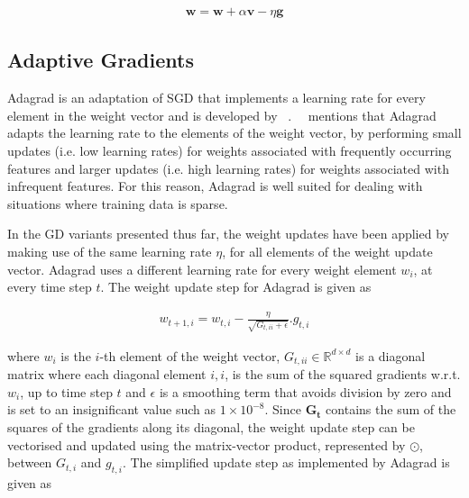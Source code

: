 \begin{equation}
	\label{eq:heuristics:gd:nag_part_2}
	\begin{split}
		\boldsymbol{w} = \boldsymbol{w} + \alpha \boldsymbol{v} - \eta \boldsymbol{g}
	\end{split}
\end{equation}


\subsection{Adaptive Gradients}\label{sec:heuristics:adagrad}

\Acf{Adagrad} is an adaptation of \acs{SGD} that implements a learning rate for every element in the weight vector and is developed by \citeauthor{ref:duchi:2011}~\cite{ref:duchi:2011}.~\citeauthor{ref:ruder:2016}~\cite{ref:ruder:2016} mentions that \acs{Adagrad} adapts the learning rate to the elements of the weight vector, by  performing small updates (i.e. low learning rates) for weights associated with frequently occurring features and larger updates (i.e. high learning rates) for weights associated with infrequent features. For this reason, \acs{Adagrad} is well suited for dealing with situations where training data is sparse.

In the \acs{GD} variants presented thus far, the weight updates have been applied by making use of the same learning rate $\eta$, for all elements of the weight update vector. \Acs{Adagrad} uses a different learning rate for every weight element $w_{i}$, at every time step $t$. The weight update step for \acs{Adagrad} is given as

\begin{equation}
	\label{eq:heuristics:gd:adagrad_part_1}
	\begin{split}
		w_{t+1,i} = w_{t,i} - \frac{\eta}{\sqrt{G_{t,ii} + \epsilon}}.g_{t,i}
	\end{split}
\end{equation}

where $w_{i}$ is the $i$-th element of the weight vector, $G_{t,ii} \in \mathbb{R}^{d \times d}$ is a diagonal matrix where each diagonal element $i,i$, is the sum of the squared gradients w.r.t. $w_{i}$, up to time step $t$ and $\epsilon$ is a smoothing term that avoids division by zero and is set to an insignificant value such as $1 \times 10^{-8}$. Since $\boldsymbol{G_{t}}$ contains the sum of the squares of the gradients along its diagonal, the weight update step can be vectorised and updated using the matrix-vector product, represented by $\odot$, between $G_{t,i}$ and $g_{t,i}$. The simplified update step as implemented by \acs{Adagrad} is given as

